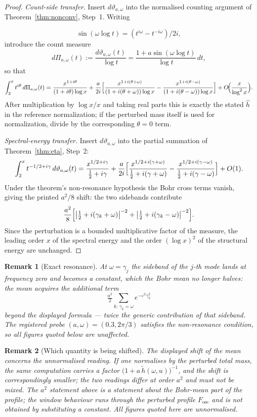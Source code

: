 \documentclass[11pt]{article}
\newtheorem*{remark}{Remark}
\begin{document}
\begin{proof}
\textit{Count-side transfer.} Insert $d\vartheta_{a,\omega}$ into the
normalised counting argument of Theorem~\ref{thm:nonconv}, Step~1. Writing

\[
\sin(\omega\log t)=(t^{i\omega}-t^{-i\omega})/2i,
\]
introduce the count measure
\[
d\Pi_{a,\omega}(t):=\frac{d\vartheta_{a,\omega}(t)}{\log t}
=\frac{1+a\sin(\omega\log t)}{\log t}\,dt,
\]
so that
\[
\int_2^x t^{i\theta}\,d\Pi_{a,\omega}(t)
=\frac{x^{1+i\theta}}{(1+i\theta)\log x}
+\frac{a}{2i}\Bigl[
\frac{x^{1+i(\theta+\omega)}}{(1+i(\theta+\omega))\log x}
-\frac{x^{1+i(\theta-\omega)}}{(1+i(\theta-\omega))\log x}
\Bigr]
+O\!\Bigl(\frac{x}{\log^2x}\Bigr).
\]
After multiplication by $\log x/x$ and taking real parts this is exactly
the stated $\widehat h$ in the reference normalization; if the perturbed
mass itself is used for normalization, divide by the corresponding
$\theta=0$ term.

\textit{Spectral-energy transfer.} Insert $d\vartheta_{a,\omega}$ into the
partial summation of Theorem~\ref{thm:eta}, Step~2:
\[
\int_2^x t^{-1/2+i\gamma}\,d\vartheta_{a,\omega}(t)
=\frac{x^{1/2+i\gamma}}{\tfrac12+i\gamma}
+\frac{a}{2i}\Bigl[
\frac{x^{1/2+i(\gamma+\omega)}}{\tfrac12+i(\gamma+\omega)}
-\frac{x^{1/2+i(\gamma-\omega)}}{\tfrac12+i(\gamma-\omega)}
\Bigr]+O(1).
\]
Under the theorem's non-resonance hypothesis the Bohr cross terms vanish,
giving the printed $a^{2}/8$ shift: the two sidebands contribute
\[
\frac{a^2}{8}\Bigl[\bigl|\tfrac12+i(\gamma_k+\omega)\bigr|^{-2}
+\bigl|\tfrac12+i(\gamma_k-\omega)\bigr|^{-2}\Bigr].
\]
Since the perturbation is a bounded
multiplicative factor of the measure, the leading order $x$ of the spectral
energy and the order $(\log x)^2$ of the structural energy are unchanged.
\end{proof}

\begin{remark}[Exact resonance]
At $\omega=\gamma_j$ the sideband of the $j$-th mode lands at frequency zero
and becomes a constant, which the Bohr mean no longer halves: the mean
acquires the additional term
\[
\tfrac{a^2}{2}\sum_{k:\,\gamma_k=\omega}e^{-\varepsilon^2\gamma_k^2}
\]
beyond the displayed formula --- twice the generic contribution of that
sideband. The registered probe $(a,\omega)=(0.3,2\pi/3)$ satisfies the
non-resonance condition, so all figures quoted below are unaffected.
\end{remark}

\begin{remark}[Which quantity is being shifted]
The displayed shift of the mean concerns the unnormalised reading. If one
normalises by the perturbed total mass, the same computation carries a factor
$\bigl(1+a\,\tilde h(\omega,u)\bigr)^{-1}$, and the shift is correspondingly
smaller; the two readings differ at order $a^2$ and must not be mixed. The
$a^2$ statement above is a statement about the Bohr-mean part of the profile;
the window behaviour runs through the perturbed profile $F_{\mathrm{osc}}$ and
is not obtained by substituting a constant. All figures quoted here are
unnormalised.
\end{remark}
\end{document}
